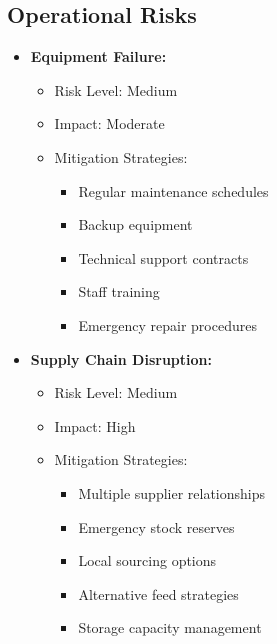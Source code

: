 \subsection{Operational Risks}
\begin{itemize}
    \item \textbf{Equipment Failure:}
    \begin{itemize}
        \item Risk Level: Medium
        \item Impact: Moderate
        \item Mitigation Strategies:
        \begin{itemize}
            \item Regular maintenance schedules
            \item Backup equipment
            \item Technical support contracts
            \item Staff training
            \item Emergency repair procedures
        \end{itemize}
    \end{itemize}
    
    \item \textbf{Supply Chain Disruption:}
    \begin{itemize}
        \item Risk Level: Medium
        \item Impact: High
        \item Mitigation Strategies:
        \begin{itemize}
            \item Multiple supplier relationships
            \item Emergency stock reserves
            \item Local sourcing options
            \item Alternative feed strategies
            \item Storage capacity management
        \end{itemize}
    \end{itemize}
\end{itemize}

